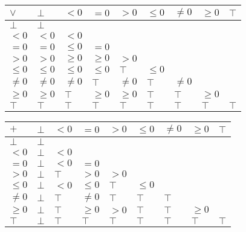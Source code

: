 \documentclass{article}
\begin{document}
\begin{table}[]
    \begin{tabular}{|l|l|l|l|l|l|l|l|l|}
    \hline
    $\lor$  & $\bot$  & $<0$    & $=0$    & $>0$    & $\le 0$ & $\ne 0$ & $\ge 0$ & $\top$ \\ \hline
    $\bot$  & $\bot$  &         &         &         &         &         &         &        \\ \hline
    $<0$    & $<0$    & $<0$    &         &         &         &         &         &        \\ \hline
    $=0$    & $=0$    & $\le 0$ & $=0$    &         &         &         &         &        \\ \hline
    $>0$    & $>0$    & $\ge 0$ & $\ge 0$ & $>0$    &         &         &         &        \\ \hline
    $\le 0$ & $\le 0$ & $\le 0$ & $\le 0$ & $\top$  & $\le 0$ &         &         &        \\ \hline
    $\ne 0$ & $\ne 0$ & $\ne 0$ & $\top$  & $\ne 0$ & $\top$  & $\ne 0$ &         &        \\ \hline
    $\ge 0$ & $\ge 0$ & $\top$  & $\ge 0$ & $\ge 0$ & $\top$  & $\top$  & $\ge 0$ &        \\ \hline
    $\top$  & $\top$  & $\top$  & $\top$  & $\top$  & $\top$  & $\top$  & $\top$  & $\top$ \\ \hline
    \end{tabular}
    \end{table}

\begin{table}[]
    \begin{tabular}{|l|l|l|l|l|l|l|l|l|}
    \hline
    $+$     & $\bot$ & $<0$   & $=0$    & $>0$   & $\le 0$ & $\ne 0$ & $\ge 0$ & $\top$ \\ \hline
    $\bot$  & $\bot$ &        &         &        &         &         &         &        \\ \hline
    $<0$    & $\bot$ & $<0$   &         &        &         &         &         &        \\ \hline
    $=0$    & $\bot$ & $<0$   & $=0$    &        &         &         &         &        \\ \hline
    $>0$    & $\bot$ & $\top$ & $>0$    & $>0$   &         &         &         &        \\ \hline
    $\le 0$ & $\bot$ & $<0$   & $\le 0$ & $\top$ & $\le 0$ &         &         &        \\ \hline
    $\ne 0$ & $\bot$ & $\top$ & $\ne 0$ & $\top$ & $\top$  & $\top$  &         &        \\ \hline
    $\ge 0$ & $\bot$ & $\top$ & $\ge 0$ & $>0$   & $\top$  & $\top$  & $\ge 0$ &        \\ \hline
    $\top$  & $\bot$ & $\top$ & $\top$  & $\top$ & $\top$  & $\top$  & $\top$  & $\top$ \\ \hline
    \end{tabular}
    \end{table}
\end{document}
